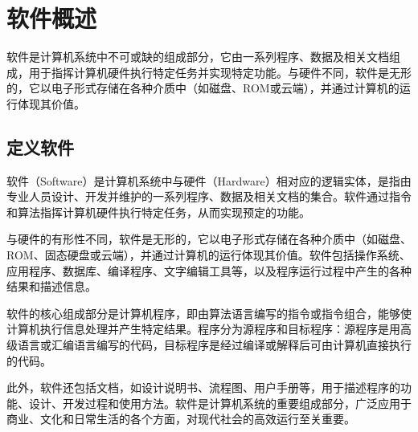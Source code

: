 \section{软件概述}

软件是计算机系统中不可或缺的组成部分，它由一系列程序、数据及相关文档组成，用于指挥计算机硬件执行特定任务并实现特定功能。与硬件不同，软件是无形的，它以电子形式存储在各种介质中（如磁盘、ROM或云端），并通过计算机的运行体现其价值。

\subsection{定义软件}

软件（Software）是计算机系统中与硬件（Hardware）相对应的逻辑实体，是指由专业人员设计、开发并维护的一系列程序、数据及相关文档的集合。软件通过指令和算法指挥计算机硬件执行特定任务，从而实现预定的功能。

与硬件的有形性不同，软件是无形的，它以电子形式存储在各种介质中（如磁盘、ROM、固态硬盘或云端），并通过计算机的运行体现其价值。软件包括操作系统、应用程序、数据库、编译程序、文字编辑工具等，以及程序运行过程中产生的各种结果和描述信息。

软件的核心组成部分是计算机程序，即由算法语言编写的指令或指令组合，能够使计算机执行信息处理并产生特定结果。程序分为源程序和目标程序：源程序是用高级语言或汇编语言编写的代码，目标程序是经过编译或解释后可由计算机直接执行的代码。

此外，软件还包括文档，如设计说明书、流程图、用户手册等，用于描述程序的功能、设计、开发过程和使用方法。软件是计算机系统的重要组成部分，广泛应用于商业、文化和日常生活的各个方面，对现代社会的高效运行至关重要。



